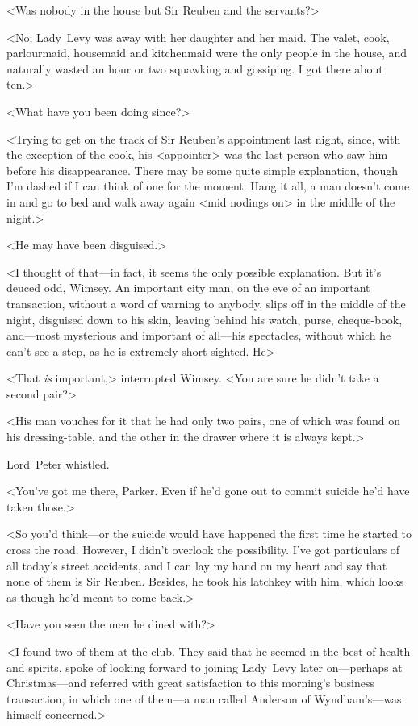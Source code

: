 <Was nobody in the house but Sir Reuben and the servants?>

<No; Lady~Levy was away with her daughter and her maid. The valet, cook, parlourmaid, housemaid and kitchenmaid were the only people in the house, and naturally wasted an hour or two squawking and gossiping. I got there about ten.>

<What have you been doing since?>

<Trying to get on the track of Sir Reuben's appointment last night, since, with the exception of the cook, his <appointer> was the last person who saw him before his disappearance. There may be some quite simple explanation, though I'm dashed if I can think of one for the moment. Hang it all, a man doesn't come in and go to bed and walk away again <mid nodings on> in the middle of the night.>

<He may have been disguised.>

<I thought of that—in fact, it seems the only possible explanation. But it's deuced odd, Wimsey. An important city man, on the eve of an important transaction, without a word of warning to anybody, slips off in the middle of the night, disguised down to his skin, leaving behind his watch, purse, cheque-book, and—most mysterious and important of all—his spectacles, without which he can't see a step, as he is extremely short-sighted. He\longdash>

<That \textit{is} important,> interrupted Wimsey. <You are sure he didn't take a second pair?>

<His man vouches for it that he had only two pairs, one of which was found on his dressing-table, and the other in the drawer where it is always kept.>

Lord~Peter whistled.

<You've got me there, Parker. Even if he'd gone out to commit suicide he'd have taken those.>

<So you'd think—or the suicide would have happened the first time he started to cross the road. However, I didn't overlook the possibility. I've got particulars of all today's street accidents, and I can lay my hand on my heart and say that none of them is Sir Reuben. Besides, he took his latchkey with him, which looks as though he'd meant to come back.>

<Have you seen the men he dined with?>

<I found two of them at the club. They said that he seemed in the best of health and spirits, spoke of looking forward to joining Lady~Levy later on—perhaps at Christmas—and referred with great satisfaction to this morning's business transaction, in which one of them—a man called Anderson of Wyndham's—was himself concerned.>

